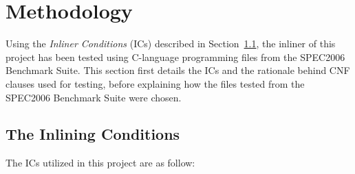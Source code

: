 
\clearpage
\section{Methodology}
\label{sec:methodology}

Using the \textit{Inliner Conditions} (ICs) described in
Section~\ref{sub:meth:inlining_conditions}, the inliner of this project has been
tested using C-language programming files from the SPEC2006 Benchmark Suite.
This section first details the ICs and the rationale behind CNF clauses used for
testing, before explaining how the files tested from the SPEC2006 Benchmark
Suite were chosen.

\subsection{The Inlining Conditions}
\label{sub:meth:inlining_conditions}

The ICs utilized in this project are as follow:

